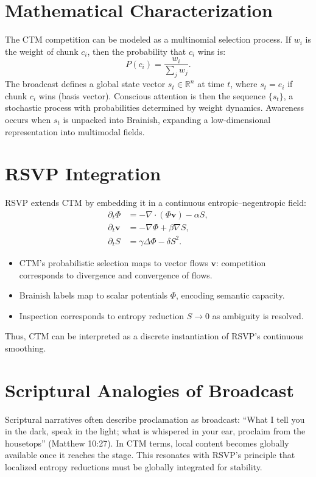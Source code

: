 \documentclass[a4paper,11pt,openany]{book}
\begin{document}
\section{Mathematical Characterization}
The CTM competition can be modeled as a multinomial selection process.  
If $w_i$ is the weight of chunk $c_i$, then the probability that $c_i$ wins is:
\[
P(c_i) = \frac{w_i}{\sum_j w_j}.
\]
The broadcast defines a global state vector $s_t \in \mathbb{R}^n$ at time $t$,  
where $s_t = e_i$ if chunk $c_i$ wins (basis vector). Conscious attention is then the 
sequence $\{s_t\}$, a stochastic process with probabilities determined by weight dynamics.  
Awareness occurs when $s_t$ is unpacked into Brainish, expanding a low-dimensional 
representation into multimodal fields.

\section{RSVP Integration}
RSVP extends CTM by embedding it in a continuous entropic–negentropic field:
\begin{align*}
\partial_t \Phi &= -\nabla \cdot (\Phi \mathbf{v}) - \alpha S, \\
\partial_t \mathbf{v} &= -\nabla \Phi + \beta \nabla S, \\
\partial_t S &= \gamma \Delta \Phi - \delta S^2.
\end{align*}
\begin{itemize}
  \item CTM’s probabilistic selection maps to vector flows $\mathbf{v}$: competition 
  corresponds to divergence and convergence of flows.
  \item Brainish labels map to scalar potentials $\Phi$, encoding semantic capacity.
  \item Inspection corresponds to entropy reduction $S \to 0$ as ambiguity is resolved.
\end{itemize}
Thus, CTM can be interpreted as a discrete instantiation of RSVP’s continuous smoothing.

\section{Scriptural Analogies of Broadcast}
Scriptural narratives often describe proclamation as broadcast: “What I tell you in the dark, 
speak in the light; what is whispered in your ear, proclaim from the housetops” 
(Matthew 10:27). In CTM terms, local content becomes globally available once it reaches 
the stage. This resonates with RSVP’s principle that localized entropy reductions 
must be globally integrated for stability.
\end{document}
